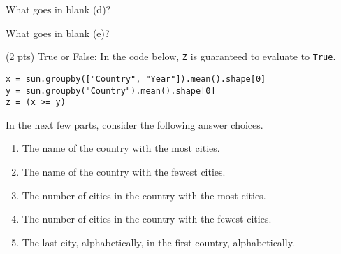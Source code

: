 \begin{prob}[(17 pts)]
\begin{subprobset}
\begin{subprob}
\vspace{.1in}

What goes in blank (d)?


\vspace{.1in}

What goes in blank (e)?







\end{subprob}

\newpage

\begin{subprob}(2 pts) True or False: In the code below, \texttt{Z} is guaranteed to evaluate to \texttt{True}.
\begin{verbatim}
x = sun.groupby(["Country", "Year"]).mean().shape[0]
y = sun.groupby("Country").mean().shape[0]
z = (x >= y)
\end{verbatim}


\end{subprob}

\end{subprobset}

In the next few parts, consider the following answer choices.

\begin{enumerate}[label=\Alph*.]
    \item The name of the country with the most cities.
    
    \item The name of the country with the fewest cities.
    
    \item The number of cities in the country with the most cities.
    
    \item The number of cities in the country with the fewest cities.
    
    \item The last city, alphabetically, in the first country, alphabetically.
    

\end{enumerate}
\end{prob}
